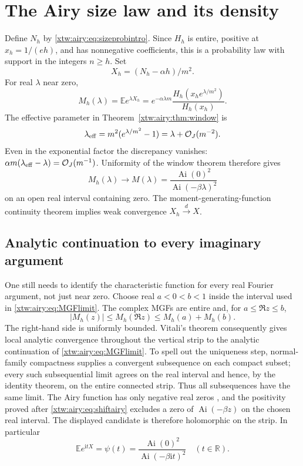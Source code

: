 \documentclass[11pt]{article}
\theoremstyle{remark}\newtheorem{remark}[theorem]{Remark}
\newcommand{\OO}{\mathcal O}
\newcommand{\R}{\mathbb R}
\newcommand{\Ai}{\operatorname{Ai}}
\newcommand{\E}{\mathbb E}
\begin{document}
\section{The Airy size law and its density}\label{xtw:airy:sec:airyprob}
Define $N_h$ by \eqref{xtw:airy:eq:sizeprobintro}. Since $H_h$ is entire, positive at
$x_h=1/(eh)$, and has nonnegative coefficients, this is a probability law
with support in the integers $n\ge h$. Set
\[
 X_h=(N_h-\alpha h)/m^2.
\]
For real $\lambda$ near zero,
\begin{equation}\label{xtw:airy:eq:MGF}
 M_h(\lambda)=\E e^{\lambda X_h}
 =e^{-\alpha\lambda m}
 \frac{H_h(x_he^{\lambda/m^2})}{H_h(x_h)}.
\end{equation}
The effective parameter in Theorem~\ref{xtw:airy:thm:window} is
\[
 \lambda_{\rm eff}=m^2(e^{\lambda/m^2}-1)
 =\lambda+\OO_J(m^{-2}).
\]
Even in the exponential factor the discrepancy vanishes:
$\alpha m(\lambda_{\rm eff}-\lambda)=\OO_J(m^{-1})$.
Uniformity of the window theorem therefore gives
\begin{equation}\label{xtw:airy:eq:MGFlimit}
 M_h(\lambda)\longrightarrow
 M(\lambda)=\frac{\Ai(0)^2}{\Ai(-\beta\lambda)^2}
\end{equation}
on an open real interval containing zero. The moment-generating-function
continuity theorem implies weak convergence $X_h\xrightarrow d X$.

\subsection{Analytic continuation to every imaginary argument}
One still needs to identify the characteristic function for every real
Fourier argument, not just near zero. Choose real $a<0<b<1$ inside the
interval used in \eqref{xtw:airy:eq:MGFlimit}. The complex MGFs are entire and, for
$a\le\Re z\le b$,
\begin{equation}\label{xtw:airy:eq:vitalibound}
 |M_h(z)|\le M_h(\Re z)\le M_h(a)+M_h(b).
\end{equation}
The right-hand side is uniformly bounded. Vitali's theorem consequently gives
local analytic convergence throughout the vertical strip to the analytic
continuation of \eqref{xtw:airy:eq:MGFlimit}. To spell out the uniqueness step,
normal-family compactness supplies a convergent subsequence on each compact
subset; every such subsequential limit agrees on the real interval and hence,
by the identity theorem, on the entire connected strip. Thus all subsequences
have the same limit. The Airy function has only negative real zeros
\cite{dlmf9}, and the positivity proved after \eqref{xtw:airy:eq:shiftairy} excludes a
zero of $\Ai(-\beta z)$ on the chosen real interval. The displayed candidate
is therefore holomorphic on the strip. In particular
\begin{equation}\label{xtw:airy:eq:psi}
 \E e^{\mathrm itX}=\psi(t)=\frac{\Ai(0)^2}{\Ai(-\beta\mathrm it)^2}
 \quad(t\in\R).
\end{equation}
\end{document}
